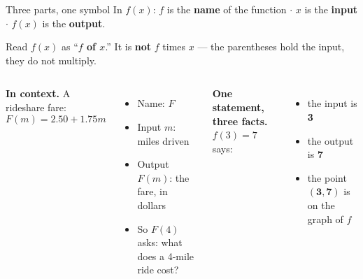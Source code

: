 \documentclass[aspectratio=169, 11pt]{beamer}
\begin{document}
\begin{frame}[t, plain]

  \begin{block}{Three parts, one symbol}
    In \(f(x)\): \quad \(f\) is the \textbf{name} of the function \(\cdot\)
    \(x\) is the \textbf{input} \(\cdot\) \(f(x)\) is the \textbf{output}.
  \end{block}

  \medskip
  Read \(f(x)\) as ``\textbf{\(f\) of \(x\)}.'' It is \textbf{not} \(f\) times
  \(x\) --- the parentheses hold the input, they do not multiply.

  \smallskip
  \begin{columns}[T]
      \textbf{In context.} A rideshare fare:
      \[ F(m) = 2.50 + 1.75m \]
      \begin{itemize}\setlength{\itemsep}{5pt}
        \item Name: \(F\)
        \item Input \(m\): miles driven
        \item Output \(F(m)\): the fare, in dollars
        \item So \(F(4)\) asks: what does a 4-mile ride cost?
      \end{itemize}

      \textbf{One statement, three facts.} \(f(3) = 7\) says:
      \begin{itemize}\setlength{\itemsep}{5pt}
        \item the input is \textbf{3}
        \item the output is \textbf{7}
        \item the point \(\mathbf{(3, 7)}\) is on the graph of \(f\)
      \end{itemize}
  \end{columns}
\end{frame}
\end{document}
